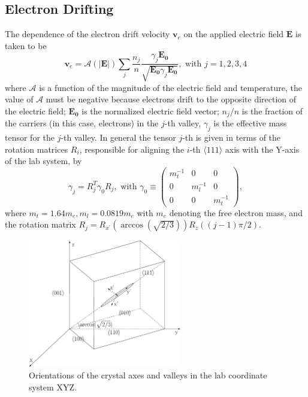 \subsection{Electron Drifting}
\label{sec:elec}
The dependence of the electron drift velocity $\mathbf{v}_{e}$ on the applied electric field $\mathbf{E}$ is taken to be
\begin{equation}
  \label{eq:ed}
  \mathbf{v}_{e} = \mathcal{A}(|\mathbf{E}|) \sum_{j} \frac{n_{j}}{n}     \frac{\gamma_{j}\mathbf{E_{0}}}     {\sqrt{\mathbf{E_{0}}\gamma_{j}\mathbf{E_{0}}}},  \mbox{ with }     j=1,2,3,4
\end{equation}
where $\mathcal{A}$ is a function of the magnitude of the electric field and temperature, the value of $\mathcal{A}$ must be negative because electrons drift to the opposite direction of the electric field; $\mathbf{E_{0}}$ is the normalized electric field vector; $n_{j}/n$ is the fraction  of the carriers (in this case, electrons) in the $j$-th valley, $\gamma_{j}$ is the effective mass tensor for the $j$-th valley. In general the tensor $j$-th is given in terms of the rotation matrices $R_{i}$, responsible for aligning the $i$-th $\langle 111 \rangle$ axis with the Y-axis of the lab system, by
\begin{equation}
  \label{eq:gammas}
  \gamma_{j} = R_{j}^{T}\gamma_{0}R_{j}, \mbox{ with } \gamma_{0}   \equiv \left(
    \begin{array}{ccc}
      m_{t}^{-1} & 0 & 0 \\
      0 & m_{l}^{-1} & 0 \\
      0 & 0 & m_{t}^{-1}
    \end{array} \right),
\end{equation}
where $m_{t} = 1.64m_{e}, m_{l} = 0.0819m_{e}$ with $m_{e}$ denoting the free electron mass, and the rotation matrix $R_{j} = R_{x^{\prime}}(\arccos(\sqrt{2/3}))R_{z}((j-1)\pi/2)$.

\begin{figure}[tbhp]
  \centering
  \includegraphics[width=0.6\textwidth]{axes.eps}  
  \caption{Orientations of the crystal axes and valleys in the lab coordinate system XYZ.}
  \label{fig:axes}
\end{figure}

